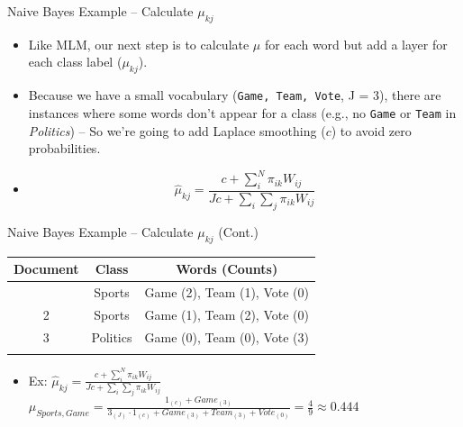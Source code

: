 \documentclass[
  ignorenonframetext,
  aspectratio=169]{beamer}
\begin{document}
\begin{frame}{Naive Bayes Example -- Calculate \(\mu_{kj}\)}
\label{naive-bayes-example-calculate-mu_kj}
\begin{itemize}
\item Like MLM, our next step is to calculate $\mu$ for each word but add a layer for each class label ($\mu_{kj}$). \par \vspace{2.5mm} \pause
\item Because we have a small vocabulary (\texttt{Game, Team, Vote}, J = 3), there are instances where some words don't appear for a class (e.g., no \texttt{Game} or \texttt{Team} in \textit{Politics}) -- So we're going to add Laplace smoothing ($c$) to avoid zero probabilities.  \par \vspace{2.5mm}
\item[] $$\hat{\mu}_{kj} = \frac{c + \sum^N_i \pi_{ik}W_{ij}}{Jc + \sum_i \sum_j \pi_{ik}W_{ij}}$$
\end{itemize}
\end{frame}

\begin{frame}{Naive Bayes Example -- Calculate \(\mu_{kj}\) (Cont.)}
\label{naive-bayes-example-calculate-mu_kj-cont.}
\begin{longtable}[]{@{}ccc@{}}
\toprule\noalign{}
Document & Class & Words (Counts) \\
\midrule\noalign{}
\endhead
1 & Sports & Game (2), Team (1), Vote (0) \\
2 & Sports & Game (1), Team (2), Vote (0) \\
3 & Politics & Game (0), Team (0), Vote (3) \\
\bottomrule\noalign{}
\end{longtable}

\vspace{2.5mm}
\begin{itemize}
\item Ex: $\hat{\mu}_{kj} = \frac{c + \sum^N_i \pi_{ik}W_{ij}}{Jc + \sum_i \sum_j \pi_{ik}W_{ij}}$ \quad $\mu_{Sports,Game} = \frac{1_{(c)} + Game_{(3)}}{ 3_{(J)}\cdot1_{(c)} + Game_{(3)} + Team_{(3)} + Vote_{(0)}} = \frac{4}{9} \approx 0.444$
\end{itemize}
\end{frame}
\end{document}
